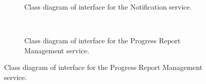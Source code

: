 \documentclass[12pt]{article}
\begin{document}
\begin{figure}[H]
\begin{subfigure}[H]{0.47\textwidth}
\centering	
{}
\caption{Class diagram of interface for the Notification service.}
\end{subfigure}
~
\begin{subfigure}[H]{0.47\textwidth}
\centering	
{}
\caption{Class diagram of interface for the Progress Report Management service.}
\end{subfigure}
\end{figure}
\end{document}
